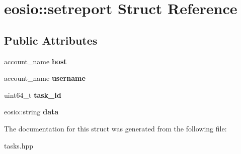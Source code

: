 \hypertarget{structeosio_1_1setreport}{}\section{eosio\+:\+:setreport Struct Reference}
\label{structeosio_1_1setreport}
\subsection*{Public Attributes}
\begin{DoxyCompactItemize}
\item 
\mbox{\label{structeosio_1_1setreport_a1ffa41c77d7604eedff2605a5419319a}} 
account\+\_\+name {\bfseries host}
\item 
\mbox{\label{structeosio_1_1setreport_a518b22541e454f866bbd83b1fbc28c2e}} 
account\+\_\+name {\bfseries username}
\item 
\mbox{\label{structeosio_1_1setreport_a62a2d7cb94348b49aeda23a8c000ceb9}} 
uint64\+\_\+t {\bfseries task\+\_\+id}
\item 
\mbox{\label{structeosio_1_1setreport_a12c8e8cb0522ff9a171a338696746c87}} 
eosio\+::string {\bfseries data}
\end{DoxyCompactItemize}


The documentation for this struct was generated from the following file\+:\begin{DoxyCompactItemize}
\item 
tasks.\+hpp\end{DoxyCompactItemize}
